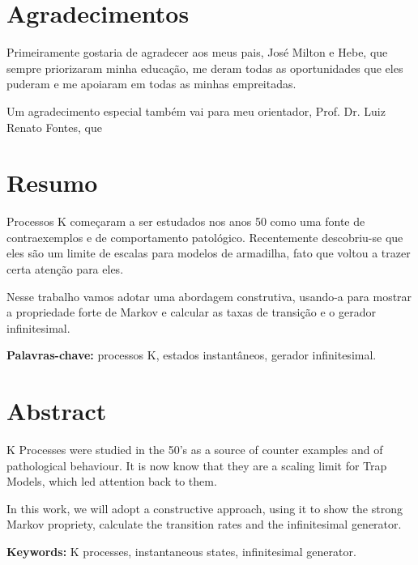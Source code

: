 \chapter*{Agradecimentos}

Primeiramente gostaria de agradecer aos meus pais, José Milton e Hebe,
que sempre priorizaram minha educação, me deram todas as oportunidades
que eles puderam e me apoiaram em todas as minhas empreitadas.

Um agradecimento especial também vai para meu orientador,
Prof. Dr. Luiz Renato Fontes, que




\chapter*{Resumo}

Processos K começaram a ser estudados nos anos 50 como uma fonte de
contraexemplos e de comportamento patológico. Recentemente
descobriu-se que eles são um limite de escalas para modelos de
armadilha, fato que voltou a trazer certa atenção para eles.

Nesse trabalho vamos adotar uma abordagem construtiva, usando-a para
mostrar a propriedade forte de Markov e calcular as taxas de transição
e o gerador infinitesimal.

\noindent \textbf{Palavras-chave:} processos K, estados instantâneos,
gerador infinitesimal.

\chapter*{Abstract}

K Processes were studied in the 50's as a source of counter examples
and of pathological behaviour. It is now know that they are a scaling
limit for Trap Models, which led attention back to them.

In this work, we will adopt a constructive approach, using it to show
the strong Markov propriety, calculate the transition rates and
the infinitesimal generator.

\noindent \textbf{Keywords:} K processes, instantaneous states,
infinitesimal generator.


